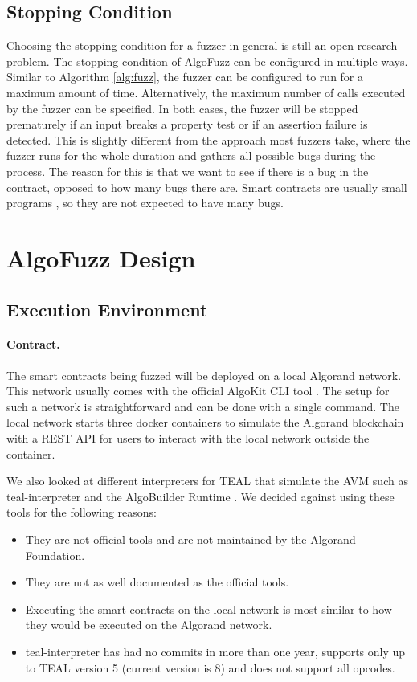 \subsection*{Stopping Condition}
Choosing the stopping condition for a fuzzer in general is still an open research problem.
The stopping condition of AlgoFuzz can be configured in multiple ways.
Similar to Algorithm \ref{alg:fuzz}, the fuzzer can be configured to run for a maximum amount of time.
Alternatively, the maximum number of calls executed by the fuzzer can be specified.
In both cases, the fuzzer will be stopped prematurely if an input breaks a property test or if an assertion failure is detected.
This is slightly different from the approach most fuzzers take, where the fuzzer runs for the whole duration and gathers all possible bugs during the process.
The reason for this is that we want to see if there is a bug in the contract, opposed to how many bugs there are.
Smart contracts are usually small programs \cite{gao_checking_2021}, so they are not expected to have many bugs.

\section{AlgoFuzz Design}

\subsection*{Execution Environment}
\paragraph*{Contract.} The smart contracts being fuzzed will be deployed on a local Algorand network. This network usually comes with the official AlgoKit CLI tool \cite{noauthor_algokit_nodate}. The setup for such a network is straightforward and can be done with a single command. The local network starts three docker containers to simulate the Algorand blockchain with a \acs{REST} \acs{API} for users to interact with the local network outside the container.

We also looked at different interpreters for \ac{TEAL} that simulate the \ac{AVM} such as teal-interpreter \cite{noauthor_hone-labsteal-interpreter_nodate} and the AlgoBuilder Runtime \cite{noauthor_algo-builderruntime_nodate}.
We decided against using these tools for the following reasons:
\begin{itemize}
    \item They are not official tools and are not maintained by the Algorand Foundation.
    \item They are not as well documented as the official tools.
    \item Executing the smart contracts on the local network is most similar to how they would be executed on the Algorand network.
    \item teal-interpreter has had no commits in more than one year, supports only up to \ac{TEAL} version 5 (current version is 8) and does not support all opcodes.
\end{itemize}

